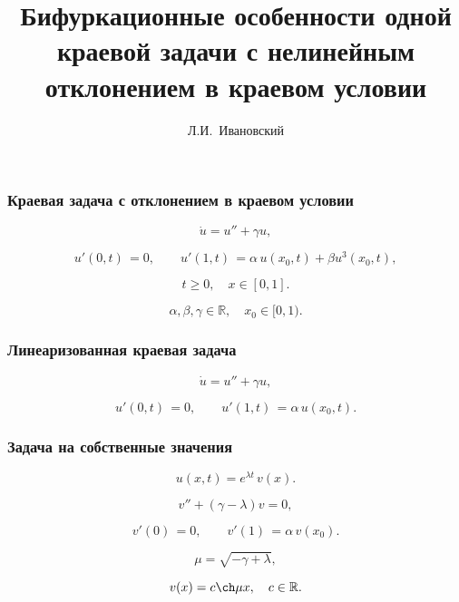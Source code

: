 \documentclass[fullscreen=true, unicode, bookmarks=false]{beamer}
\title[]{ {\huge Бифуркационные особенности одной краевой задачи с нелинейным отклонением в краевом условии } }
\author[]{{\large Л.И.~Ивановский}}
\date{ }
\institute[]
{ ЯрГУ им. П.Г. Демидова }
\begin{document}
\begin{frame}
\titlepage
\end{frame} 

\begin{frame}
\frametitle{ Краевая задача с отклонением в краевом условии }
 
\begin{equation}
	\dot u = u'' + \gamma u,	
\end{equation}

\begin{equation}
	u'(0, t) \, = 0, \qquad u'(1, t) \, = \alpha\,u(x_0, t) + \beta u^3(x_0, t),
\end{equation}

\bigskip

$$ t \geqslant 0, \quad x \in [0,1]. $$


$$ \alpha, \beta, \gamma \in \mathbb{R}, \quad x_0 \in [0, 1). $$

\end{frame}

\begin{frame}
\frametitle{ Линеаризованная краевая задача }
 
\begin{equation}
	\dot u = u'' + \gamma u,	
\end{equation}

\begin{equation}	
	u'(0, t) \, = 0, \qquad u'(1, t) \, = \alpha\,u(x_0, t).
\end{equation}

\end{frame}

\begin{frame}
\frametitle{ Задача на собственные значения }
 
$$ u(x, t) = e^{\lambda t} \, v(x). $$

\bigskip
 
\begin{equation}
	v'' + (\gamma - \lambda)v = 0,	
\end{equation}

\begin{equation}	
	v'(0) \, = 0, \qquad v'(1) \, = \alpha\,v(x_0).
\end{equation}

\bigskip

$$ \mu = \sqrt{-\gamma + \lambda}, $$

$$ v(x) = c \ch  \mu x, \quad c \in \mathbb{R}. $$

\end{frame}
\end{document}
